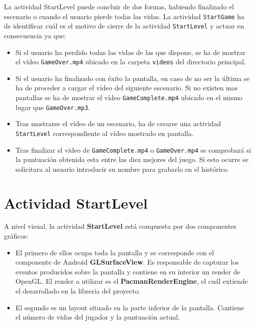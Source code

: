 La actividad StartLevel puede concluir de dos formas, habiendo finalizado el escenario o cuando el usuario pierde todas las vidas. La actividad \texttt{StartGame} ha de identificar cuál es el motivo de cierre de la actividad \texttt{StartLevel} y actuar en consecuencia ya que:
\begin{itemize}
\item Si el usuario ha perdido todas las vidas de las que dispone, se ha de mostrar el vídeo \texttt{GameOver.mp4} ubicado en la carpeta \texttt{videos} del directorio principal.
\item Si el usuario ha finalizado con éxito la pantalla, en caso de no ser la última se ha de proceder a cargar el vídeo del siguiente escenario. Si no existen mas pantallas se ha de mostrar el vídeo \texttt{GameComplete.mp4} ubicado en el mismo lugar que \texttt{GameOver.mp3}.
\item Tras mostrarse el vídeo de un escenario, ha de crearse una actividad \texttt{StartLevel} correspondiente al vídeo mostrado en pantalla.
\item Tras finalizar el vídeo de \texttt{GameComplete.mp4} o \texttt{GameOver.mp4} se comprobará si la puntuación obtenida esta entre las diez mejores del juego. Si esto ocurre se solicitara al usuario introducir su nombre para grabarlo en el histórico.
\end{itemize}

\section{Actividad StartLevel}

A nivel visual, la actividad \textbf{StartLevel} está compuesta por dos componentes gráficos:
\begin{itemize} 
\item El primero de ellos ocupa toda la pantalla y se corresponde con el componente de Android \textbf{GLSurfaceView}. Es responsable de capturar los eventos producidos sobre la pantalla y contiene en su interior un render de OpenGL. El render a utilizar es el \textbf{PacmanRenderEngine}, el cuál extiende el desarrollado en la librería del proyecto. 

\item El segundo es un layout situado en la parte  inferior de la pantalla. Contiene el número de vidas del jugador y la puntuación actual.
\end{itemize}

